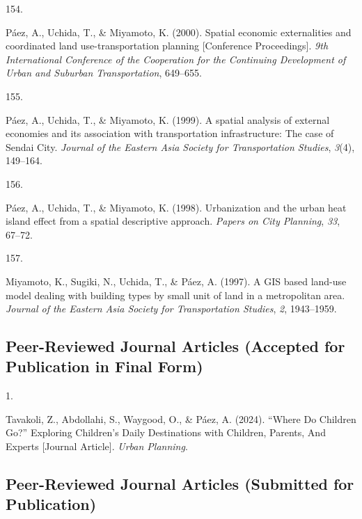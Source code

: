 \documentclass[11pt,a4paper,]{awesome-cv}
\newlength{\cslhangindent}
\newlength{\csllabelwidth}
\newenvironment{CSLReferences}[2] %
 {\begin{list}{}{%
  \setlength{\itemindent}{0pt}
  \setlength{\leftmargin}{0pt}
  \setlength{\parsep}{0pt}
  \ifodd #1
   \setlength{\leftmargin}{\cslhangindent}
   \setlength{\itemindent}{-1\cslhangindent}
  \fi
  \setlength{\itemsep}{#2\baselineskip}}}
 {\end{list}}
\newcommand{\CSLLeftMargin}[1]{\parbox[t]{\csllabelwidth}{\strut#1\strut}}
\newcommand{\CSLRightInline}[1]{\parbox[t]{\linewidth - \csllabelwidth}{\strut#1\strut}}
\begin{document}
\begin{CSLReferences}{0}{0}
\CSLLeftMargin{154. }%
\CSLRightInline{Páez, A., Uchida, T., \& Miyamoto, K. (2000). Spatial
economic externalities and coordinated land use-transportation planning
{[}Conference Proceedings{]}. \emph{9th International Conference of the
Cooperation for the Continuing Development of Urban and Suburban
Transportation}, 649--655.}

\CSLLeftMargin{155. }%
\CSLRightInline{Páez, A., Uchida, T., \& Miyamoto, K. (1999). A spatial
analysis of external economies and its association with transportation
infrastructure: The case of Sendai City. \emph{Journal of the Eastern
Asia Society for Transportation Studies}, \emph{3}(4), 149--164.}

\CSLLeftMargin{156. }%
\CSLRightInline{Páez, A., Uchida, T., \& Miyamoto, K. (1998).
Urbanization and the urban heat island effect from a spatial descriptive
approach. \emph{Papers on City Planning}, \emph{33}, 67--72.}

\CSLLeftMargin{157. }%
\CSLRightInline{Miyamoto, K., Sugiki, N., Uchida, T., \& Páez, A.
(1997). A GIS based land-use model dealing with building types by small
unit of land in a metropolitan area. \emph{Journal of the Eastern Asia
Society for Transportation Studies}, \emph{2}, 1943--1959.}

\end{CSLReferences}

\subsection{Peer-Reviewed Journal Articles (Accepted for Publication in
Final
Form)}\label{peer-reviewed-journal-articles-accepted-for-publication-in-final-form}

\label{refs-c9cf48bba34206a44422126f1017ebab}
\begin{CSLReferences}{0}{0}
\CSLLeftMargin{1. }%
\CSLRightInline{Tavakoli, Z., Abdollahi, S., Waygood, O., \& Páez, A.
(2024). {``Where Do Children Go?''} Exploring Children's Daily
Destinations with Children, Parents, And Experts {[}Journal Article{]}.
\emph{Urban Planning}.}

\end{CSLReferences}

\subsection{Peer-Reviewed Journal Articles (Submitted for
Publication)}\label{peer-reviewed-journal-articles-submitted-for-publication}
\end{document}
